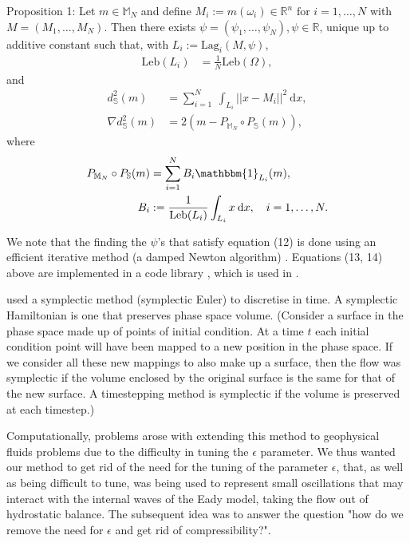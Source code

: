 \documentclass[11pt, oneside]{article}   	%
\newcommand{\R}{\mathbb{R}}
\newcommand{\MN}{\mathbb{M}_N}
\newcommand{\dsmsq}{d^{2}_{\mathbb{S}}(m)}
\newcommand{\graddsmsq}{\nabla{d^{2}_{\mathbb{S}}(m)}}
\newcommand{\Leb}{\mathrm{Leb}}
\begin{document}
Proposition 1: Let \(m \in \MN\) and define \(M_i := m(\omega_i) \in \R^n \text{ for } i = 1,\dots,N\) with \(M = (M_1,\dots,M_N)\). Then there exists \(\psi = (\psi_1,\dots,\psi_N), \psi \in \R\), unique up to additive constant such that, with \(L_i := \mathrm{Lag}_i(M, \psi)\), 
\begin{align}
\Leb(L_i) &= \frac{1}{N}\Leb(\Omega),
\end{align}
and
\begin{align}
\dsmsq & = \sum_{i=1}^N \: \int_{L_i} || x - M_i ||^2 \: \mathrm{d}x, \\
\graddsmsq &= 2(m - P_{\MN} \circ P_{\mathbb{S}}(m)),
\end{align}
where
\begin{align}
P_{\MN} \circ P_{\mathbb{S}}(m) &= \sum^N_{i=1} B_i \mathbbm{1}_{L_i}(m), \\
B_i &:= \frac{1}{\Leb(L_i)} \int_{L_i} x \: \mathrm{d}x, \quad i = 1,\dots,N. 
\end{align}

We note that the finding the \(\psi\)'s that satisfy equation (12) is done using an efficient iterative method (a damped Newton algorithm) \citep{merigot2017algorithm}. Equations (13, 14) above are implemented in a code library \citep{merigotpymongeampere}, which is used in \cite{gallouet2016lagrangian}. 

\cite{gallouet2016lagrangian} used a symplectic method (symplectic Euler) to discretise in time. A symplectic Hamiltonian is one that preserves phase space volume. (Consider a surface in the phase space made up of points of initial condition. At a time \(t\) each initial condition point will have been mapped to a new position in the phase space. If we consider all these new mappings to also make up a surface, then the flow was symplectic if the volume enclosed by the original surface is the same for that of the new surface. A timestepping method is symplectic if the volume is preserved at each timestep.)

Computationally, problems arose with extending this method to geophysical fluids problems due to the difficulty in tuning the \(\epsilon\) parameter. We thus wanted our method to get rid of the need for the tuning of the parameter \(\epsilon\), that, as well as being difficult to tune, was being used to represent small oscillations that may interact with the internal waves of the Eady model, taking the flow out of hydrostatic balance. The subsequent idea was to answer the question "how do we remove the need for \(\epsilon\) and get rid of compressibility?".
\end{document}
